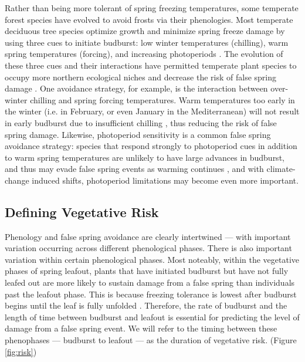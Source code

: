 \documentclass{article}\usepackage[]{graphicx}\usepackage[]{color}
\begin{document}
Rather than being more tolerant of spring freezing temperatures, some temperate forest species have evolved to avoid frosts via their phenologies. %
Most temperate deciduous tree species optimize growth and minimize spring freeze damage by using three cues to initiate budburst: low winter temperatures (chilling), warm spring temperatures (forcing), and increasing photoperiods \citep{Chuine2010}. The evolution of these three cues and their interactions have permitted temperate plant species to occupy more northern ecological niches \citep{Kollas2014} and decrease the risk of false spring damage %
\citep{Charrier2011}. One avoidance strategy, for example, is the interaction between over-winter chilling and spring forcing temperatures. Warm temperatures too early in the winter (i.e. in February, or even January in the Mediterranean) %
will not result in early budburst due to insufficient chilling \citep{Basler2012}, thus reducing the risk of false spring damage. Likewise, photoperiod sensitivity is a common false spring avoidance strategy: species that respond strongly to photoperiod cues %
in addition to warm spring temperatures are unlikely to have large advances in budburst, and thus may evade false spring events as warming continues \citep{Basler2014}, and with climate-change induced shifts, photoperiod limitations may become even more important.

\subsection*{Defining Vegetative Risk}
Phenology and false spring avoidance are clearly intertwined --- with important variation occurring across different phenological phases. %
There is also important variation within certain phenological phases. Most noteably, within the vegetative phases of spring leafout, plants that have initiated budburst but have not fully leafed out are more likely to sustain damage from a false spring than individuals past the leafout phase. This is because freezing tolerance is lowest after budburst begins until the leaf is fully unfolded \citep{Lenz2016}. Therefore, the rate of budburst and the length of time between budburst and leafout is essential for predicting the level of damage from a false spring event. We will refer to the timing between these phenophases --- budburst to leafout --- as the duration of vegetative risk. (Figure \ref{fig:risk})
\end{document}
